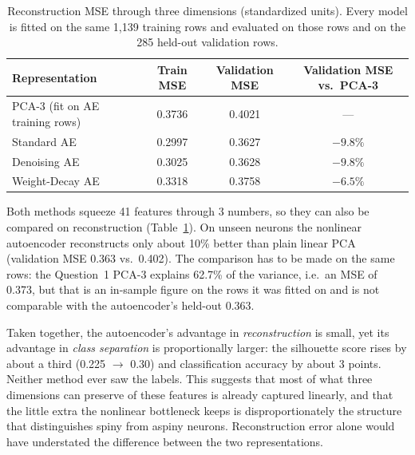 \begin{table}[H]
\centering
\caption{Reconstruction MSE through three dimensions (standardized units). Every model is fitted on the same 1,139 training rows and evaluated on those rows and on the 285 held-out validation rows.\protect\footnotemark}
\label{tab:b2c-recon}
\small
\begin{tabular}{@{}lccc@{}}
\toprule
\textbf{Representation} & \textbf{Train MSE} & \textbf{Validation MSE} & \textbf{Validation MSE vs.\ PCA-3} \\
\midrule
PCA-3 (fit on AE training rows) & 0.3736 & 0.4021 & --- \\
Standard AE & 0.2997 & 0.3627 & $-9.8\%$ \\
Denoising AE & 0.3025 & 0.3628 & $-9.8\%$ \\
Weight-Decay AE & 0.3318 & 0.3758 & $-6.5\%$ \\
\bottomrule
\end{tabular}
\end{table}
Both methods squeeze 41 features through 3 numbers, so they can also be compared on reconstruction (Table~\ref{tab:b2c-recon}). On unseen neurons the nonlinear autoencoder reconstructs only about 10\% better than plain linear PCA (validation MSE 0.363 vs.\ 0.402). The comparison has to be made on the same rows: the Question~1 PCA-3 explains 62.7\% of the variance, i.e.\ an MSE of 0.373, but that is an in-sample figure on the rows it was fitted on and is not comparable with the autoencoder's held-out 0.363.

Taken together, the autoencoder's advantage in \emph{reconstruction} is small, yet its advantage in \emph{class separation} is proportionally larger: the silhouette score rises by about a third (0.225 $\rightarrow$ 0.30) and classification accuracy by about 3 points. Neither method ever saw the labels. This suggests that most of what three dimensions can preserve of these features is already captured linearly, and that the little extra the nonlinear bottleneck keeps is disproportionately the structure that distinguishes spiny from aspiny neurons. Reconstruction error alone would have understated the difference between the two representations.

